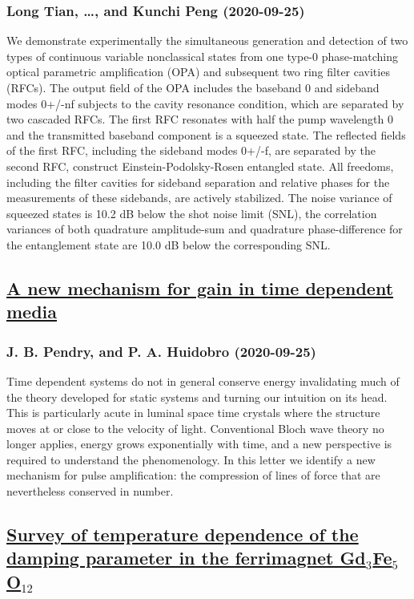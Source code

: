 \subsubsection*{Long Tian, \dots, and Kunchi Peng (2020-09-25)}
We demonstrate experimentally the simultaneous generation and detection of
two types of continuous variable nonclassical states from one type-0
phase-matching optical parametric amplification (OPA) and subsequent two ring
filter cavities (RFCs). The output field of the OPA includes the baseband
{\omega}0 and sideband modes {\omega}0+/-n{\omega}f subjects to the cavity
resonance condition, which are separated by two cascaded RFCs. The first RFC
resonates with half the pump wavelength {\omega}0 and the transmitted baseband
component is a squeezed state. The reflected fields of the first RFC, including
the sideband modes {\omega}0+/-{\omega}f, are separated by the second RFC,
construct Einstein-Podolsky-Rosen entangled state. All freedoms, including the
filter cavities for sideband separation and relative phases for the
measurements of these sidebands, are actively stabilized. The noise variance of
squeezed states is 10.2 dB below the shot noise limit (SNL), the correlation
variances of both quadrature amplitude-sum and quadrature phase-difference for
the entanglement state are 10.0 dB below the corresponding SNL.

\subsection*{\href{http://arxiv.org/abs/2009.12077v1}{A new mechanism for gain in time dependent media}}
\subsubsection*{J. B. Pendry, and P. A. Huidobro (2020-09-25)}
Time dependent systems do not in general conserve energy invalidating much of
the theory developed for static systems and turning our intuition on its head.
This is particularly acute in luminal space time crystals where the structure
moves at or close to the velocity of light. Conventional Bloch wave theory no
longer applies, energy grows exponentially with time, and a new perspective is
required to understand the phenomenology. In this letter we identify a new
mechanism for pulse amplification: the compression of lines of force that are
nevertheless conserved in number.

\subsection*{\href{http://arxiv.org/abs/2009.12073v1}{Survey of temperature dependence of the damping parameter in the  ferrimagnet Gd$_3$Fe$_5$O$_{12}$}}
